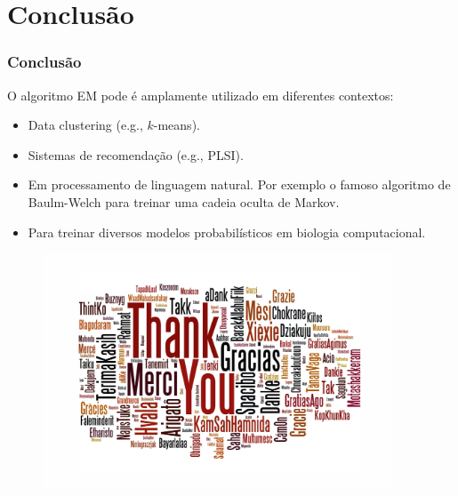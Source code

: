 \documentclass{beamer}
\begin{document}
\section{Conclusão}
\begin{frame}
	\frametitle{Conclusão}
	O algoritmo EM pode é amplamente utilizado em diferentes contextos:
	\begin{itemize}
		\item Data clustering (e.g., $k$-means).\pause
		\item Sistemas de recomendação (e.g., PLSI). \pause
		\item Em processamento de linguagem natural. \pause
		Por exemplo o famoso algoritmo de Baulm-Welch para treinar uma
		cadeia oculta de Markov.
		\pause
		\item Para treinar diversos modelos probabilísticos em
		biologia computacional.
	\end{itemize}

\end{frame}

\begin{frame}

  \begin{figure}[ht!]
    \centering
    \includegraphics[height=7cm]{thank-you.jpg}
  \end{figure}


\end{frame}
\end{document}
